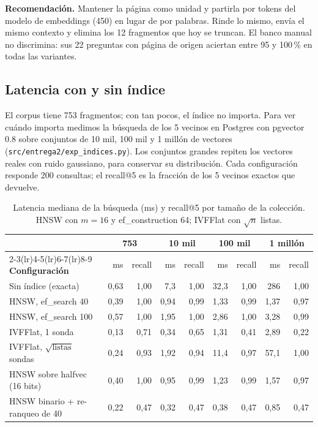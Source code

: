 \documentclass[11pt,letterpaper]{article}
\newcommand{\cod}[1]{\texttt{\small #1}}
\begin{document}
\textbf{Recomendación.} Mantener la página como unidad y partirla por tokens del modelo de embeddings (450) en lugar de por palabras. Rinde lo mismo, envía el mismo contexto y elimina los 12 fragmentos que hoy se truncan. El banco manual no discrimina: sus 22 preguntas con página de origen aciertan entre 95 y 100\,\% en todas las variantes.

\subsection{Latencia con y sin índice}
\label{sec:indices}

El corpus tiene 753 fragmentos; con tan pocos, el índice no importa. Para ver cuándo importa medimos la búsqueda de los 5 vecinos en Postgres con pgvector 0.8 sobre conjuntos de 10 mil, 100 mil y 1 millón de vectores (\cod{src/entrega2/exp\_indices.py}). Los conjuntos grandes repiten los vectores reales con ruido gaussiano, para conservar su distribución. Cada configuración responde 200 consultas; el recall@5 es la fracción de los 5 vecinos exactos que devuelve.

\begin{table}[H]\small\renewcommand{\arraystretch}{1.12}\centering
\begin{tabular}{lrrrrrrrr}
\toprule
& \multicolumn{2}{c}{\textbf{753}} & \multicolumn{2}{c}{\textbf{10 mil}} & \multicolumn{2}{c}{\textbf{100 mil}} & \multicolumn{2}{c}{\textbf{1 millón}} \\
\cmidrule(lr){2-3}\cmidrule(lr){4-5}\cmidrule(lr){6-7}\cmidrule(lr){8-9}
\textbf{Configuración} & ms & recall & ms & recall & ms & recall & ms & recall \\
\midrule
Sin índice (exacta) & 0,63 & 1,00 & 7,3 & 1,00 & 32,3 & 1,00 & 286 & 1,00 \\
HNSW, ef\_search 40 & 0,39 & 1,00 & 0,94 & 0,99 & 1,33 & 0,99 & 1,37 & 0,97 \\
HNSW, ef\_search 100 & 0,57 & 1,00 & 1,95 & 1,00 & 2,86 & 1,00 & 3,28 & 0,99 \\
IVFFlat, 1 sonda & 0,13 & 0,71 & 0,34 & 0,65 & 1,31 & 0,41 & 2,89 & 0,22 \\
IVFFlat, $\sqrt{\mathrm{listas}}$ sondas & 0,24 & 0,93 & 1,92 & 0,94 & 11,4 & 0,97 & 57,1 & 1,00 \\
HNSW sobre halfvec (16 bits) & 0,40 & 1,00 & 0,95 & 0,99 & 1,23 & 0,99 & 1,57 & 0,97 \\
HNSW binario + re-ranqueo de 40 & 0,22 & 0,47 & 0,32 & 0,47 & 0,38 & 0,47 & 0,85 & 0,47 \\
\bottomrule
\end{tabular}
\caption{Latencia mediana de la búsqueda (ms) y recall@5 por tamaño de la colección. HNSW con $m = 16$ y ef\_construction 64; IVFFlat con $\sqrt{n}$ listas.}
\label{tab:indices}
\end{table}
\end{document}
